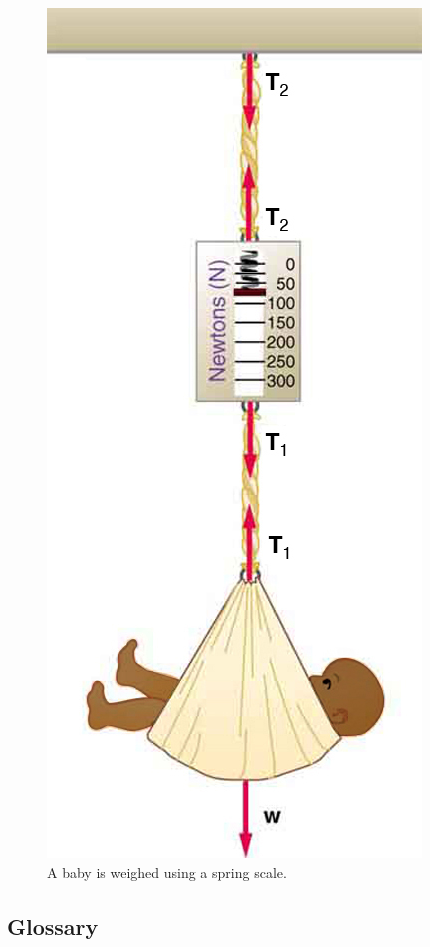 \documentclass[
]{book}
\newenvironment{problems-exercises}{}{}
\begin{document}
\begin{problems-exercises}
\begin{figure}
\hypertarget{import-auto-id2140140}{%
\centering
\includegraphics{images/Figure_04_05_14.jpg}
\caption{A baby is weighed using a spring
scale.}\label{import-auto-id2140140}
}
\end{figure}

\end{problems-exercises}

\hypertarget{glossary-15}{%
\subsection{Glossary}\label{glossary-15}}
\end{document}
